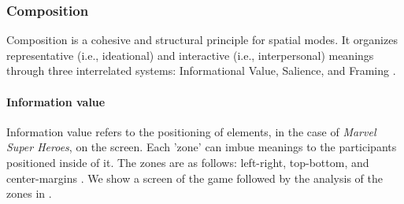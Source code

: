 \documentclass[english]{textolivre}
\begin{document}
\subsubsection{Composition}\label{sec-resumo}
Composition is a cohesive and structural principle for spatial modes. It organizes representative (i.e., ideational) and interactive (i.e., interpersonal) meanings through three interrelated systems: Informational Value, Salience, and Framing \cite[p.~179;198-217;274]{van_leeuwen_introducing_2005}.

\paragraph{Information value}\label{sec-secoes}
Information value refers to the positioning of elements, in the case of \textit{Marvel Super Heroes}, on the screen. Each 'zone' can imbue meanings to the participants positioned inside of it. The zones are as follows: left-right, top-bottom, and center-margins \cites[p. 179]{kress_reading_2020}. We show a screen of the game followed by the analysis of the zones in .
\end{document}
